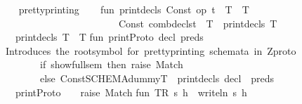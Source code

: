 \begin{isabellebody}
\isanewline
\isanewline
{\isacharparenleft}{\isacharasterisk}\ {\isacharasterisk}{\isacharasterisk}{\isacharasterisk}{\isacharasterisk}{\isacharasterisk}{\isacharasterisk}{\isacharasterisk}{\isacharasterisk}{\isacharasterisk}{\isacharasterisk}{\isacharasterisk}{\isacharasterisk}{\isacharasterisk}{\isacharasterisk}{\isacharasterisk}\ {\isacharasterisk}{\isacharparenright}\isanewline
{\isacharparenleft}{\isacharasterisk}\ pretty{\isacharminus}printing\ {\isacharasterisk}{\isacharparenright}\isanewline
{\isacharparenleft}{\isacharasterisk}\ {\isacharasterisk}{\isacharasterisk}{\isacharasterisk}{\isacharasterisk}{\isacharasterisk}{\isacharasterisk}{\isacharasterisk}{\isacharasterisk}{\isacharasterisk}{\isacharasterisk}{\isacharasterisk}{\isacharasterisk}{\isacharasterisk}{\isacharasterisk}{\isacharasterisk}\ {\isacharasterisk}{\isacharparenright}\isanewline
\isanewline
\isanewline
fun\ print{\isacharunderscore}decls\ {\isacharparenleft}Const\ {\isacharparenleft}{\isachardoublequote}op\ {\isacharampersand}{\isachardoublequote}{\isacharcomma}t{\isacharparenright}\ {\isachardollar}\ T\ {\isachardollar}\ T{\isacharprime}{\isacharparenright}\ {\isacharequal}\ \isanewline
\ \ \ \ \ \ \ \ \ \ \ \ \ \ \ \ \ \ \ \ \ \ \ \ Const\ {\isacharparenleft}{\isachardoublequote}{\isacharunderscore}combdecls{\isachardoublequote}{\isacharcomma}t{\isacharparenright}\ {\isachardollar}\ T\ {\isachardollar}\ {\isacharparenleft}print{\isacharunderscore}decls\ T{\isacharprime}{\isacharparenright}\isanewline
\ \ \ {\isacharbar}print{\isacharunderscore}decls\ T\ {\isacharequal}\ T{\isacharsemicolon}\isanewline
\isanewline
fun\ print{\isacharunderscore}Proto\ {\isacharbrackleft}decl{\isacharcomma}\ preds{\isacharbrackright}\ {\isacharequal}\ \isanewline
{\isacharparenleft}{\isacharasterisk}\ Introduces\ the\ root{\isacharminus}symbol\ for\ pretty{\isacharminus}printing\ schemata\ in\ Zproto\ {\isacharasterisk}{\isacharparenright}\ \isanewline
\ \ \ \ \ \ \ \ if\ {\isacharbang}show{\isacharunderscore}full{\isacharunderscore}sem\ then\ raise\ Match\isanewline
\ \ \ \ \ \ \ \ else\ Const{\isacharparenleft}{\isachardoublequote}SCHEMA{\isachardoublequote}{\isacharcomma}dummyT{\isacharparenright}\ {\isachardollar}\ {\isacharparenleft}print{\isacharunderscore}decls\ decl{\isacharparenright}\ {\isachardollar}\ preds\isanewline
\ \ \ {\isacharbar}print{\isacharunderscore}Proto\ {\isacharunderscore}\ \ {\isacharequal}\ raise\ Match{\isacharsemicolon}\isanewline
\isanewline
fun\ TR\ s\ h\ {\isacharequal}\ {\isacharparenleft}writeln\ s{\isacharsemicolon}\ h{\isacharparenright}\isanewline
\isanewline

\end{isabellebody}
